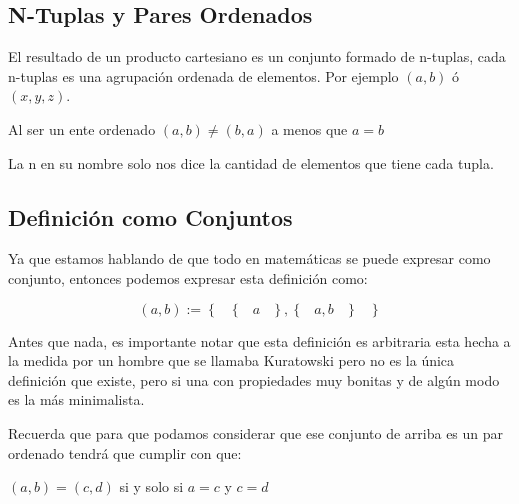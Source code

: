 \documentclass[12pt, fleqn]{report}                             %
\DeclareMathOperator \Space {\quad}                             %
\DeclareMathOperator \MiniSpace {\;}                            %
\newcommand{\Set}[1]{\left\{ \MiniSpace #1 \MiniSpace \right\}} %
\begin{document}
            \subsection{N-Tuplas y Pares Ordenados}

                El resultado de un producto cartesiano es un conjunto formado de n-tuplas,
                cada n-tuplas es una agrupación ordenada de elementos.
                Por ejemplo $(a,b)$ ó $(x,y,z)$.


                Al ser un ente ordenado $(a,b) \neq (b,a)$ a menos que $a=b$

                La n en su nombre solo nos dice la cantidad de elementos que tiene cada tupla.



                \subsection*{Definición como Conjuntos}

                    Ya que estamos hablando de que todo en matemáticas se puede expresar como
                    conjunto, entonces podemos expresar esta definición como:

                    \begin{equation}
                        (a, b) := \Set{ \Set{a}, \Set{a, b} }
                    \end{equation}

                    Antes que nada, es importante notar que esta definición es arbitraria
                    esta hecha a la medida por un hombre que se llamaba Kuratowski pero
                    no es la única definición que existe, pero si una con propiedades muy
                    bonitas y de algún modo es la más minimalista.

                    \clearpage

                    Recuerda que para que podamos considerar que ese conjunto de arriba es
                    un par ordenado tendrá que cumplir con que:

                    $(a,b) = (c, d)$ si y solo si $a=c$ y $c=d$
\end{document}
